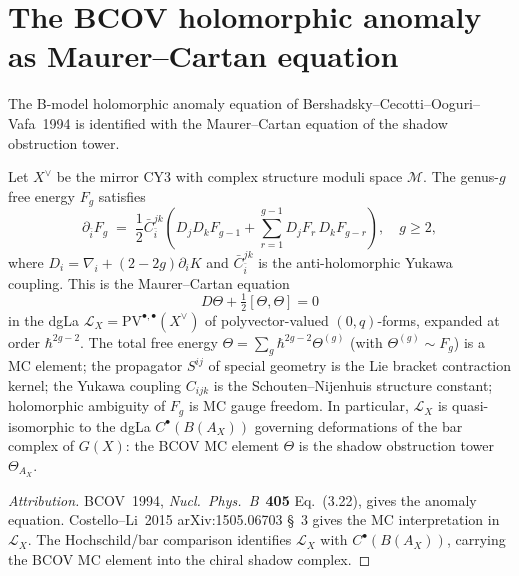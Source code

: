 \section{The BCOV holomorphic anomaly as Maurer--Cartan equation}
\label{sec:phys-top-bcov-mc}

The B-model holomorphic anomaly equation of Bershadsky--Cecotti--Ooguri--Vafa~1994 is identified with the Maurer--Cartan equation of the shadow obstruction tower.

\begin{proposition}[BCOV = MC, schematic]
\label{prop:phys-bcov-mc}
Let $X^\vee$ be the mirror CY3 with complex structure moduli space $\mathcal{M}$. The genus-$g$ free energy $F_g$ satisfies
\begin{equation}\label{eq:phys-bcov}
\partial_{\bar{i}} F_g \;=\; \frac{1}{2}\bar{C}^{jk}_{\bar{i}}
\!\left(D_j D_k F_{g-1} + \sum_{r=1}^{g-1} D_j F_r\, D_k F_{g-r}\right), \quad g \geq 2,
\end{equation}
where $D_i = \nabla_i + (2-2g)\partial_i K$ and $\bar{C}^{jk}_{\bar{i}}$ is the anti-holomorphic Yukawa coupling. This is the Maurer--Cartan equation
\[
D\Theta + \tfrac{1}{2}[\Theta, \Theta] = 0
\]
in the dgLa $\mathcal{L}_X = \mathrm{PV}^{\bullet,\bullet}(X^\vee)$ of polyvector-valued $(0,q)$-forms, expanded at order $\hbar^{2g-2}$. The total free energy $\Theta = \sum_g \hbar^{2g-2} \Theta^{(g)}$ (with $\Theta^{(g)} \sim F_g$) is a MC element; the propagator $S^{ij}$ of special geometry is the Lie bracket contraction kernel; the Yukawa coupling $C_{ijk}$ is the Schouten--Nijenhuis structure constant; holomorphic ambiguity of $F_g$ is MC gauge freedom. In particular, $\mathcal{L}_X$ is quasi-isomorphic to the dgLa $C^\bullet(B(A_X))$ governing deformations of the bar complex of $G(X)$: the BCOV MC element $\Theta$ is the shadow obstruction tower $\Theta_{A_X}$.
\end{proposition}

\begin{proof}[Attribution]
BCOV~1994, \emph{Nucl.\ Phys.\ B}~\textbf{405} Eq.~(3.22), gives the anomaly equation. Costello--Li~2015 arXiv:1505.06703 \S~3 gives the MC interpretation in $\mathcal L_X$. The Hochschild/bar comparison identifies $\mathcal L_X$ with $C^\bullet(B(A_X))$, carrying the BCOV MC element into the chiral shadow complex.
\end{proof}

